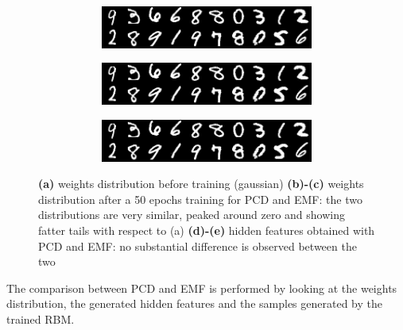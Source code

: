 \documentclass{revtex4-1}
\begin{document}
\begin{figure}
\begin{subfigure}{.25\linewidth}
    \caption{} 
    \label{fig:features_tap}
  \end{subfigure}
  \begin{subfigure}{.25\linewidth}
  	\begin{subfigure}{\linewidth}
  		\includegraphics[width=\linewidth]{samples.png}
        \caption{} 
        \label{fig:samples_mnist}
  	\end{subfigure}
  	\begin{subfigure}{\linewidth}
  		\includegraphics[width=\linewidth]{samples.png}
        \caption{} 
        \label{fig:samples_pcd}
  	\end{subfigure}
  	\begin{subfigure}{\linewidth}
  		\includegraphics[width=\linewidth]{samples.png}
        \caption{} 
        \label{fig:samples_tap}
  	\end{subfigure}
  \end{subfigure}
  
 \caption{\textbf{(a)} weights distribution before training (gaussian) \textbf{(b)-(c)} weights distribution after a 50 epochs training for PCD and EMF: the two distributions are very similar, peaked around zero and showing fatter tails with respect to (a) \textbf{(d)-(e)} hidden features obtained with PCD and EMF: no substantial difference is observed between the two}
\end{figure}

The comparison between PCD and EMF is performed by looking at the weights distribution, the generated hidden features and the samples generated by the trained RBM.
\end{document}
